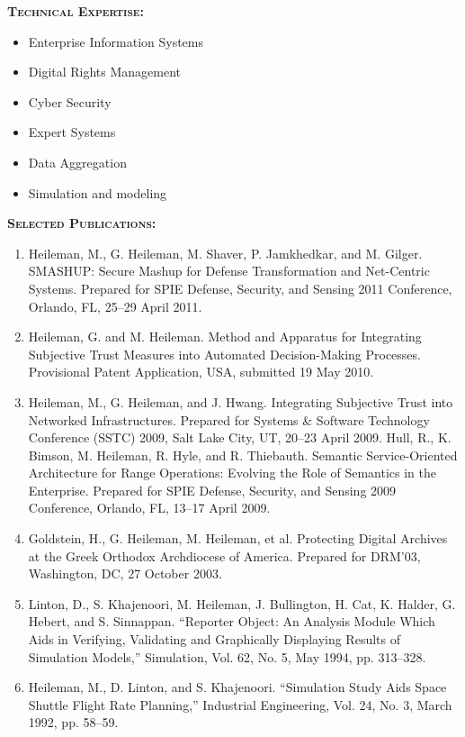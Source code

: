 \documentclass{sbir}
\begin{document}
\vspace{-18pt}
{\textcolor{black}{\makebox[6.5in]{\hrulefill}} 
\textbf{\textsc{Technical Expertise:}}
\vspace{-8pt}
\begin{multicols}{2}
 \begin{itemize}
  \item Enterprise Information Systems
  \item Digital Rights Management
  \item Cyber Security
  \item Expert Systems
  \item Data Aggregation
  \item Simulation and modeling	
 \end{itemize}
\end{multicols}
\vspace{-12pt}
\textbf{\textsc{Selected Publications:}}
\vspace{-8pt}
\begin{enumerate}
\item Heileman, M., G. Heileman, M. Shaver, P. Jamkhedkar, and M. Gilger. SMASHUP: Secure Mashup for Defense Transformation and Net-Centric Systems. Prepared for SPIE Defense, Security, and Sensing 2011 Conference, Orlando, FL, 25--29 April 2011.
\item Heileman, G. and M. Heileman. Method and Apparatus for Integrating Subjective Trust Measures into Automated Decision-Making Processes. Provisional Patent Application, USA, submitted 19 May 2010.
\item Heileman, M., G. Heileman, and J. Hwang. Integrating Subjective Trust into Networked Infrastructures. Prepared for Systems \& Software Technology Conference (SSTC) 2009, Salt Lake City, UT, 20--23 April 2009.
Hull, R., K. Bimson, M. Heileman, R. Hyle, and R. Thiebauth. Semantic Service-Oriented Architecture for Range Operations: Evolving the Role of Semantics in the Enterprise. Prepared for SPIE Defense, Security, and Sensing 2009 Conference, Orlando, FL, 13--17 April 2009.
\item Goldstein, H., G. Heileman, M. Heileman, et al. Protecting Digital Archives at the Greek Orthodox Archdiocese of America. Prepared for DRM'03, Washington, DC, 27 October 2003.
\item Linton, D., S. Khajenoori, M. Heileman, J. Bullington, H. Cat, K. Halder, G. Hebert, and S. Sinnappan. ``Reporter Object: An Analysis Module Which Aids in Verifying, Validating and Graphically Displaying Results of Simulation Models,'' Simulation, Vol. 62, No. 5, May 1994, pp. 313--328.
\item Heileman, M., D. Linton, and S. Khajenoori. ``Simulation Study Aids Space Shuttle Flight Rate Planning,'' Industrial Engineering, Vol. 24, No. 3, March 1992, pp. 58--59.


\end{enumerate}}
\end{document}
